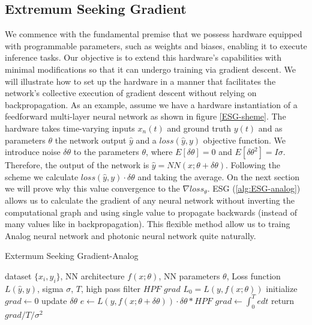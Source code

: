 \documentclass[nohyperref]{article}
\theoremstyle{plain}
\theoremstyle{definition}
\theoremstyle{remark}
\begin{document}
\subsection{Extremum Seeking Gradient}
We commence with the fundamental premise that we possess hardware equipped with programmable parameters, such as weights and biases, enabling it to execute inference tasks. Our objective is to extend this hardware's capabilities with minimal modifications so that it can undergo training via gradient descent. We will illustrate how to set up the hardware in a manner that facilitates the network's collective execution of gradient descent without relying on backpropagation.
As an example, assume we have a hardware instantiation of a feedforward multi-layer neural network as shown in figure \ref{ESG-sheme}. The hardware takes time-varying inputs ${x_{n}(t)}$ and ground truth $y(t)$ and as parameters $\theta$ the network output $\hat{y}$ and a $loss(\hat{y}, y)$ objective function.
We introduce noise $\delta\theta$ to the parameters $\theta$, where $E[\delta\theta]=0$ and $E[\delta\theta^{2}]=I\sigma$. Therefore, the output of the network is $\hat{y} = NN(x;\theta+\delta\theta)$. Following the scheme we calculate $loss(\hat{y},y)\cdot \delta\theta$ and taking the average. On the next section we will prove why this value convergence to the $\nabla loss_{\theta}$.
ESG (\cref{alg:ESG-analog}) allows us to calculate the gradient of any neural network without inverting the computational graph and using single value to propagate backwards (instead of many values like in backpropagation).
This flexible method allow us to traing Analog neural network and photonic neural network quite naturally.
\begin{algorithm}[tb]
   \caption{Extermum Seeking Gradient-Analog}
   \label{alg:ESG-analog}
\begin{algorithmic}
   dataset $\{x_{i},y_{i}\}$, NN architecture $f(x;\theta)$, NN parameters $\theta$, Loss function $L(\hat{y},y)$, sigma $\sigma$, $T$, high pass filter $HPF$
   $grad$ 
   \STATE $L_{0} = L(y,f(x;\theta))$
   \STATE initialize $grad \leftarrow 0$
   \STATE update $\delta\theta$
   \STATE $e \leftarrow L(y,f(x;\theta+\delta \theta))\cdot\delta \theta*HPF$
   \STATE $grad \leftarrow \int_{0}^{T}e dt $ 
   \ENDFOR
   \STATE return $grad/T/\sigma^{2}$
\end{algorithmic}
\end{algorithm}
\end{document}
